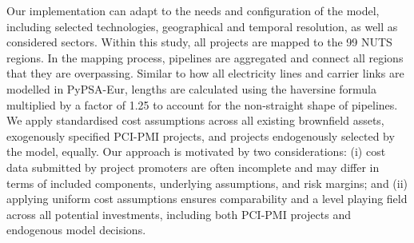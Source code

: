 \documentclass[pdflatex,sn-nature]{sn-jnl}%
\theoremstyle{thmstyleone}%
\theoremstyle{thmstyletwo}%
\theoremstyle{thmstylethree}%
\begin{document}
Our implementation can adapt to the needs and configuration of the model, including selected technologies, geographical and temporal resolution, as well as considered sectors. Within this study, all projects are mapped to the 99 NUTS regions. In the mapping process, pipelines are aggregated and connect all regions that they are overpassing. Similar to how all electricity lines and carrier links are modelled in PyPSA-Eur, lengths are calculated using the haversine formula multiplied by a factor of 1.25 to account for the non-straight shape of pipelines.
We apply standardised cost assumptions \cite{zeyenPyPSATechnologydataV01012025} across all existing brownfield assets, exogenously specified PCI-PMI projects, and projects endogenously selected by the model, equally. Our approach is motivated by two considerations: (i) cost data submitted by project promoters are often incomplete and may differ in terms of included components, underlying assumptions, and risk margins; and (ii) applying uniform cost assumptions ensures comparability and a level playing field across all potential investments, including both PCI-PMI projects and endogenous model decisions.
\end{document}
